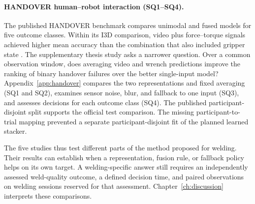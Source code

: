 \paragraph{HANDOVER human--robot interaction (SQ1--SQ4).}
The published HANDOVER benchmark compares unimodal and fused models for five outcome classes. Within its I3D comparison, video plus force--torque signals achieved higher mean accuracy than the combination that also included gripper state \citep[PDF p.~7, Table~III]{Thoduka2024Handover}. The supplementary thesis study asks a narrower question. Over a common observation window, does averaging video and wrench predictions improve the ranking of binary handover failures over the better single-input model? Appendix~\ref{app:handover} compares the two representations and fixed averaging (SQ1 and SQ2), examines sensor noise, blur, and fallback to one input (SQ3), and assesses decisions for each outcome class (SQ4). The published participant-disjoint split supports the official test comparison. The missing participant-to-trial mapping prevented a separate participant-disjoint fit of the planned learned stacker.

\medskip
\noindent The five studies thus test different parts of the method proposed for welding. Their results can establish when a representation, fusion rule, or fallback policy helps on its own target. A welding-specific answer still requires an independently assessed weld-quality outcome, a defined decision time, and paired observations on welding sessions reserved for that assessment. Chapter~\ref{ch:discussion} interprets these comparisons.
